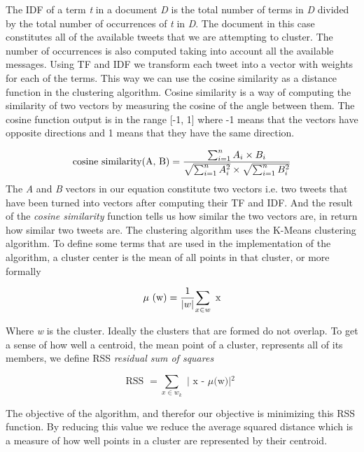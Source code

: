 The IDF of a term \textit{t} in a document \textit{D} is the total number of terms in \textit{D} divided by the total number of occurrences of \textit{t} in \textit{D}. The document in this case constitutes all of the available tweets that we are attempting to cluster. The number of occurrences is also computed taking into account all the available messages.
\newline
Using TF and IDF we transform each tweet into a vector with weights for each of the terms. This way we can use the cosine similarity as a distance function in the clustering algorithm. Cosine similarity is a way of computing the similarity of two vectors by measuring the cosine of the angle between them. The cosine function output is in the range [-1, 1] where -1 means that the vectors have opposite directions and 1 means that they have the same direction. 

\begin{equation}
	\text{cosine similarity(A, B)} = {\sum_{i=1}^{n} A_i \times B_i \over
				\sqrt{\sum_{i=1}^{n} A_i^2} \times \sqrt{\sum_{i=1}^{n} B_i^2 }}
\end{equation}
\newline
The \textit{A} and \textit{B} vectors in our equation constitute two vectors i.e. two tweets that have been turned into vectors after computing their TF and IDF. And the result of the \textit{cosine similarity} function tells us how similar the two vectors are, in return how similar two tweets are.
\newline
\newline
The clustering algorithm uses the K-Means clustering algorithm.
To define some terms that are used in the implementation of the algorithm, a cluster center is the mean of all points in that cluster, or more formally

\begin{equation}
\text{ $\mu$ (w)} = { {1 \over |w| } {\sum_{x \in w} \textrm{ x } } }	
\end{equation}


Where \textit{w} is the cluster. Ideally the clusters that are formed do not overlap. To get a sense of how well a centroid, the mean point of a cluster, represents all of its members, we define RSS \textit{residual sum of squares}

\begin{equation}
\text{ RSS } = {{\sum_{x \in w_{k}}} \textrm{ | x - $\mu$(w)|$^{2}$ } }
\end{equation}

The objective of the algorithm, and therefor our objective is minimizing this RSS function. By reducing this value we reduce the average squared distance which is a measure of how well points in a cluster are represented by their centroid.

